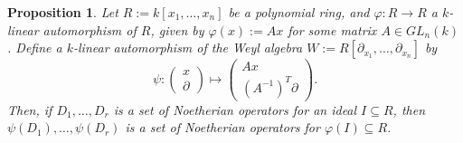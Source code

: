 \documentclass[letterpaper]{article}
\theoremstyle{plain}
\newtheorem{proposition}[theorem]{Proposition}
\theoremstyle{definition}
\theoremstyle{remark}
\begin{document}
\begin{proposition}
Let $R := k[x_1, \ldots, x_n]$ be a polynomial ring, and $\varphi : R \to R$ a $k$-linear automorphism of $R$, given by $\varphi(x) := Ax$ for some matrix $A \in GL_n(k)$. Define a $k$-linear automorphism of the Weyl algebra $W := R[\partial_{x_1}, \ldots, \partial_{x_n}]$ by 
\[
\psi : \begin{pmatrix}
x \\
\partial 
\end{pmatrix} \mapsto 
\begin{pmatrix}
Ax \\
(A^{-1})^T \partial 
\end{pmatrix}.
\]
Then, if $D_1, \ldots, D_r$ is a set of Noetherian operators for an ideal $I \subseteq R$, then $\psi(D_1), \ldots, \psi(D_r)$ is a set of Noetherian operators for $\varphi(I) \subseteq R$.
\end{proposition}
\end{document}
